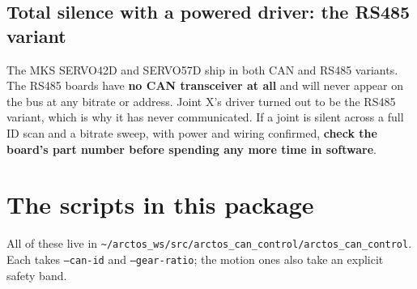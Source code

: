 \documentclass[11pt,letterpaper]{article}
\begin{document}
\subsection{Total silence with a powered driver: the RS485 variant}
\label{sec:rs485}

The MKS SERVO42D and SERVO57D ship in both CAN and RS485 variants. The RS485 boards
have \textbf{no CAN transceiver at all} and will never appear on the bus at any
bitrate or address. Joint X's driver turned out to be the RS485 variant, which is why
it has never communicated. If a joint is silent across a full ID scan and a bitrate
sweep, with power and wiring confirmed, \textbf{check the board's part number before
spending any more time in software}.

\section{The scripts in this package}

All of these live in \texttt{\textasciitilde/arctos\_ws/src/arctos\_can\_control/arctos\_can\_control}.
Each takes \texttt{--can-id} and \texttt{--gear-ratio}; the motion ones also take an
explicit safety band.
\end{document}
